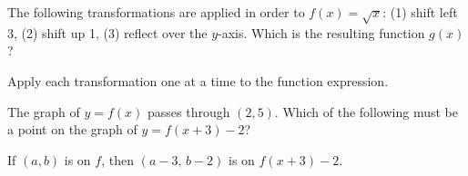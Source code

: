\documentclass{ximera}
\begin{document}
\begin{problem}
The following transformations are applied in order to $f(x) = \sqrt{x}$: (1) shift left 3, (2) shift up 1, (3) reflect over the $y$-axis. Which is the resulting function $g(x)$?
\begin{hint}
Apply each transformation one at a time to the function expression.
\end{hint}
\begin{multipleChoice}
\end{multipleChoice}
\end{problem}

\begin{problem}
The graph of $y = f(x)$ passes through $(2,5)$. Which of the following must be a point on the graph of $y = f(x+3) - 2$?
\begin{hint}
If $(a,b)$ is on $f$, then $(a-3,\,b-2)$ is on $f(x+3)-2$.
\end{hint}
\begin{multipleChoice}
\end{multipleChoice}
\end{problem}
\end{document}
